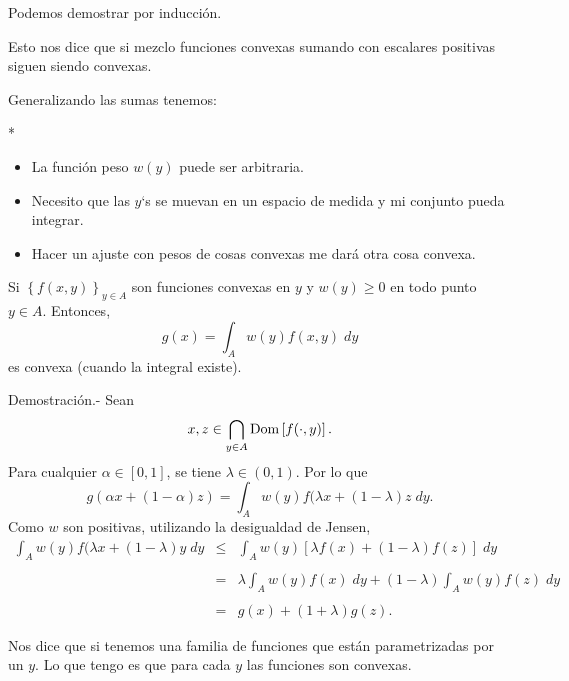 \begin{paracol}{2}
\begin{teo}
Podemos demostrar por inducción.
\end{teo}

\begin{tcolorbox}[colframe=white]
Esto nos dice que si mezclo funciones convexas sumando 
con escalares positivas siguen siendo convexas.
\end{tcolorbox}

Generalizando las sumas tenemos:

\switchcolumn[1]*{\noindent\scriptsize
    \begin{itemize}
	\item La función peso $w(y)$ puede ser arbitraria. 
	\item Necesito que las $y$`s se muevan en un espacio de medida y mi conjunto pueda integrar.
	\item Hacer un ajuste con pesos de cosas convexas me dará otra cosa convexa.
    \end{itemize}
}
\switchcolumn[0]\noindent
\begin{teo} Si $\left\{f(x,y)\right\}_{y\in A}$ son funciones convexas en $y$ y $w(y)\geq 0$ en todo punto $y\in A$. Entonces,
    $$g(x)=\int_A w(y) f(x,y)\;dy$$
    es convexa (cuando la integral existe).

    Demostración.-\; Sean 
    $$x,z\in \bigcap_{y\in A}\mathop{\mbox{\normalfont Dom}}\nolimits\left[f(\cdot,y)\right].$$ 
    Para cualquier $\alpha\in [0,1]$, se tiene $\lambda\in (0,1)$. Por lo que 
    $$g(\alpha x+(1-\alpha)z)=\int_A w(y)f(\lambda x+(1-\lambda)z\;dy.$$
    Como $w$ son positivas, utilizando la desigualdad de Jensen,
    $$
    \begin{array}{rcl}
	\displaystyle\int_A w(y)f(\lambda x+(1-\lambda)y\;dy&\leq & \displaystyle\int_A w(y)\left[\lambda f(x)+(1-\lambda)f(z)\right]\;dy\\\\
					       &=& \lambda \displaystyle\int_A w(y)f(x)\; dy + (1-\lambda)\int_Aw(y)f(z)\; dy\\\\
					       &=& g(x)+(1+\lambda)g(z).
    \end{array}
    $$
\end{teo}

\begin{tcolorbox}[colframe=white]
Nos dice que si tenemos una familia de funciones que están parametrizadas por un $y$. Lo que tengo es que para cada $y$ las funciones son convexas. 
\end{tcolorbox}



\end{paracol}
